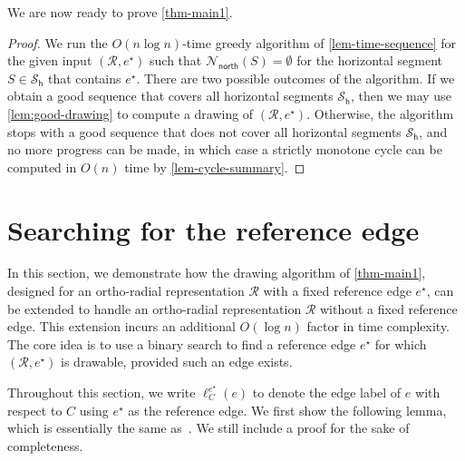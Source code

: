 \documentclass{article}\usepackage[a4paper,margin=20mm]{geometry}
\newcommand{\RR}{\mathcal{R}}
\newcommand{\PH}{\mathcal{S}_\mathsf{h}}
\newcommand{\Nnorth}{\mathcal{N}_\mathsf{north}}
\newcommand{\eref}{e^\star}
\begin{document}
We are now ready to prove \cref{thm-main1}.

\thmone*

\begin{proof}%
We run the $O(n \log n)$-time greedy algorithm of \cref{lem-time-sequence} for the given input $(\RR, \eref)$  such that $\Nnorth(S) = \emptyset$ for the horizontal segment $S\in \PH$ that contains $\eref$. 
There are two possible outcomes of the algorithm. If we obtain a good sequence that covers all horizontal segments $\PH$, then we may use \cref{lem:good-drawing} to compute a drawing of $(\RR, \eref)$. Otherwise, the algorithm stops with a good sequence that does not cover all horizontal segments $\PH$, and no more progress can be made, in which case a strictly monotone cycle can be computed in $O(n)$ time by \cref{lem-cycle-summary}.
\end{proof}
 

\section{Searching for the reference edge}\label{sect:binary-search}

In this section, we demonstrate how the drawing algorithm of \cref{thm-main1}, designed for an ortho-radial representation $\RR$ with a fixed reference edge $\eref$, can be extended to handle an ortho-radial representation $\RR$ without a fixed reference edge. This extension incurs an additional $O(\log n)$ factor in time complexity. The core idea is to use a binary search to find a reference edge $\eref$ for which $(\RR, \eref)$ is drawable, provided such an edge exists.


Throughout this section, we write $\ell_C^{\eref}(e)$ to denote the edge label of $e$ with respect to $C$ using $\eref$ as the reference edge. We first show the following lemma, which is essentially the same as~\cite[Lemma 4.2]{barth2023topology}. We still include a proof for the sake of completeness.
\end{document}
